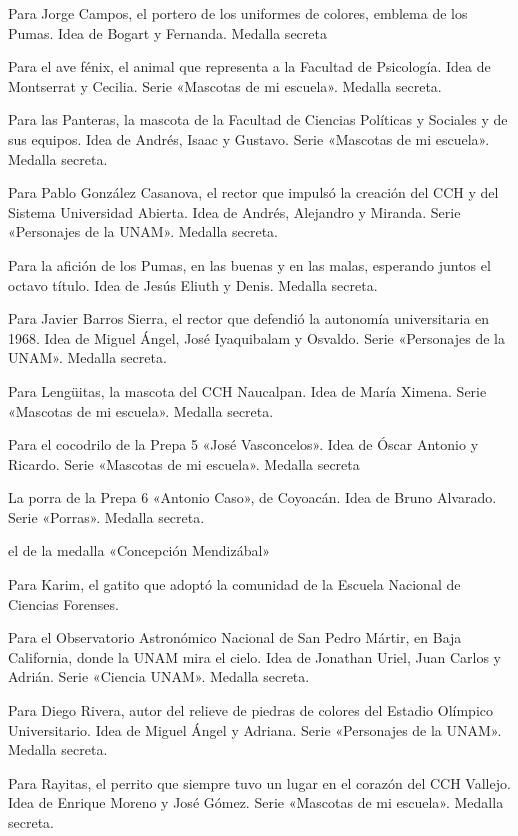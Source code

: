 \begin{description}[leftmargin=1.4cm, style=nextline]
  \item[J0RG3C4MP0] Para Jorge Campos, el portero de los uniformes de colores, emblema de los Pumas. Idea de Bogart y Fernanda. Medalla secreta
  \item[4V3F3N1X] Para el ave fénix, el animal que representa a la Facultad de Psicología. Idea de Montserrat y Cecilia. Serie «Mascotas de mi escuela». Medalla secreta.
  \item[P4NT3R4S] Para las Panteras, la mascota de la Facultad de Ciencias Políticas y Sociales y de sus equipos. Idea de Andrés, Isaac y Gustavo. Serie «Mascotas de mi escuela». Medalla secreta.
  \item[C4S4N0V4] Para Pablo González Casanova, el rector que impulsó la creación del CCH y del Sistema Universidad Abierta. Idea de Andrés, Alejandro y Miranda. Serie «Personajes de la UNAM». Medalla secreta.
  \item[L4OCT4V4] Para la afición de los Pumas, en las buenas y en las malas, esperando juntos el octavo título. Idea de Jesús Eliuth y Denis. Medalla secreta.
  \item[B4RR0S] Para Javier Barros Sierra, el rector que defendió la autonomía universitaria en 1968. Idea de Miguel Ángel, José Iyaquibalam y Osvaldo. Serie «Personajes de la UNAM». Medalla secreta.
  \item[L3NGU4S] Para Lengüitas, la mascota del CCH Naucalpan. Idea de María Ximena. Serie «Mascotas de mi escuela». Medalla secreta.
  \item[C0C0DR1L0] Para el cocodrilo de la Prepa 5 «José Vasconcelos». Idea de Óscar Antonio y Ricardo. Serie «Mascotas de mi escuela». Medalla secreta
  \item[T3HU4C4N] La porra de la Prepa 6 «Antonio Caso», de Coyoacán. Idea de Bruno Alvarado. Serie «Porras». Medalla secreta.
  \item[M3ND1Z4B4L] el de la medalla «Concepción Mendizábal»
  \item[K4R1M] Para Karim, el gatito que adoptó la comunidad de la Escuela Nacional de Ciencias Forenses.
  \item[0ANSPM] Para el Observatorio Astronómico Nacional de San Pedro Mártir, en Baja California, donde la UNAM mira el cielo. Idea de Jonathan Uriel, Juan Carlos y Adrián. Serie «Ciencia UNAM». Medalla secreta.
  \item[R1V3R4] Para Diego Rivera, autor del relieve de piedras de colores del Estadio Olímpico Universitario. Idea de Miguel Ángel y Adriana. Serie «Personajes de la UNAM». Medalla secreta.
  \item[R4Y1TAS] Para Rayitas, el perrito que siempre tuvo un lugar en el corazón del CCH Vallejo. Idea de Enrique Moreno y José Gómez. Serie «Mascotas de mi escuela». Medalla secreta.

\end{description}
